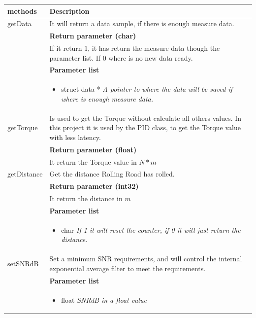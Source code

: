 \begin{table}[H]
	\centering
	\begin{tabular}{|p{5 cm}|p{10 cm}|}
		\hline
		\textbf{methods} & \textbf{Description} \\ \hline
		
		getData
		& It will return a data sample, if there is enough measure data. 
		\\ & \textbf{Return parameter (char)}
		\\ & If it return 1, it has return the measure data though the parameter list. If 0 where is no new data ready.
		\\ & \textbf{Parameter list}
		\\ & \begin{itemize}
			\item {\large struct data *}
			\subitem \textit{A pointer to where the data will be saved if where is enough measure data.}
		\end{itemize}
		\\ \hline
		
		getTorque \fxnote{klasse diagram passer ikke sammen med klassebeskrivelse}
		& Is used to get the Torque without calculate all others values. In this project it is used by the PID class, to get the Torque value with less latency.
		\\ & \textbf{Return parameter (float)}
		\\ & It return the Torque value in $ N*m $ 
		\\ \hline
		
		getDistance
		& Get the distance Rolling Road has rolled. 
		\\ & \textbf{Return parameter (int32)}
		\\ & It return the distance in $ m $
		\\ & \textbf{Parameter list}
		\\ & \begin{itemize}
			\item {\large char}
			\subitem \textit{If 1 it will reset the counter, if 0 it will just return the distance.}
		\end{itemize}
		\\ \hline
		
		setSNRdB
		& Set a minimum SNR requirements, and will control the internal exponential average filter to meet the requirements.  
		\\ & \textbf{Parameter list}
		\\ & \begin{itemize}
			\item {\large float}
			\subitem \textit{SNRdB in a float value}
		\end{itemize}
		\\ \hline
		

\end{tabular}
\end{table}
